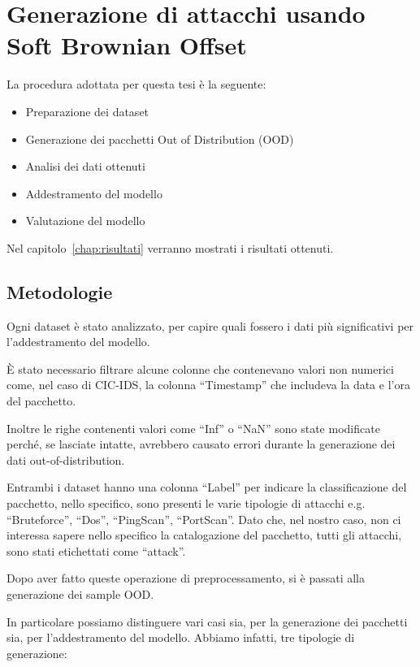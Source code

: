 \chapter{Generazione di attacchi usando Soft Brownian Offset}
\label{chap:generazione_di_attacchi_usando_sbo}

La procedura adottata per questa tesi è la seguente:

\begin{itemize}
    \item Preparazione dei dataset
    \item Generazione dei pacchetti Out of Distribution (OOD)
    \item Analisi dei dati ottenuti
    \item Addestramento del modello
    \item Valutazione del modello
\end{itemize}



Nel capitolo~\ref{chap:risultati} verranno mostrati i risultati ottenuti.


\section{Metodologie}

Ogni dataset è stato analizzato, per capire quali fossero i dati più significativi per l'addestramento del modello. 

È stato necessario filtrare alcune colonne che contenevano valori non numerici come, nel caso di CIC-IDS, la colonna ``Timestamp'' che includeva la data e l'ora del pacchetto.

Inoltre le righe contenenti valori come ``Inf'' o ``NaN'' sono state modificate perché, se lasciate intatte, avrebbero causato errori durante la generazione dei dati out-of-distribution.

Entrambi i dataset hanno una colonna ``Label'' per indicare la classificazione del pacchetto, nello specifico, sono presenti le varie tipologie di attacchi e.g. ``Bruteforce'', ``Dos'', ``PingScan'', ``PortScan''. Dato che, nel nostro caso, non ci interessa sapere nello specifico la catalogazione del pacchetto, tutti gli attacchi, sono stati etichettati come ``attack''.

Dopo aver fatto queste operazione di preprocessamento, si è passati alla generazione dei sample OOD.

In particolare possiamo distinguere vari casi sia, per la generazione dei pacchetti sia, per l'addestramento del modello. Abbiamo infatti, tre tipologie di generazione:

